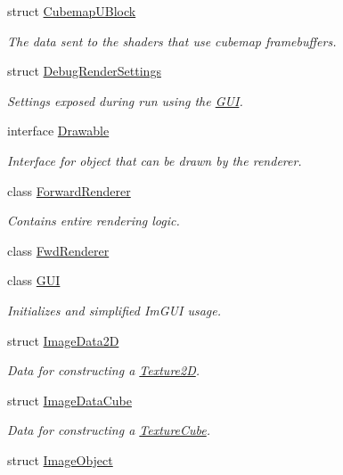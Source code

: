 \begin{DoxyCompactItemize}
struct \hyperlink{structblaze_1_1CubemapUBlock}{Cubemap\+U\+Block}
\begin{DoxyCompactList}\small\item\em The data sent to the shaders that use cubemap framebuffers. \end{DoxyCompactList}\item 
struct \hyperlink{structblaze_1_1DebugRenderSettings}{Debug\+Render\+Settings}
\begin{DoxyCompactList}\small\item\em Settings exposed during run using the \hyperlink{classblaze_1_1GUI}{G\+UI}. \end{DoxyCompactList}\item 
interface \hyperlink{classblaze_1_1Drawable}{Drawable}
\begin{DoxyCompactList}\small\item\em Interface for object that can be drawn by the renderer. \end{DoxyCompactList}\item 
class \hyperlink{classblaze_1_1ForwardRenderer}{Forward\+Renderer}
\begin{DoxyCompactList}\small\item\em Contains entire rendering logic. \end{DoxyCompactList}\item 
class \hyperlink{classblaze_1_1FwdRenderer}{Fwd\+Renderer}
\item 
class \hyperlink{classblaze_1_1GUI}{G\+UI}
\begin{DoxyCompactList}\small\item\em Initializes and simplified Im\+G\+UI usage. \end{DoxyCompactList}\item 
struct \hyperlink{structblaze_1_1ImageData2D}{Image\+Data2D}
\begin{DoxyCompactList}\small\item\em Data for constructing a \hyperlink{classblaze_1_1Texture2D}{Texture2D}. \end{DoxyCompactList}\item 
struct \hyperlink{structblaze_1_1ImageDataCube}{Image\+Data\+Cube}
\begin{DoxyCompactList}\small\item\em Data for constructing a \hyperlink{classblaze_1_1TextureCube}{Texture\+Cube}. \end{DoxyCompactList}\item 
struct \hyperlink{structblaze_1_1ImageObject}{Image\+Object}

\end{DoxyCompactItemize}
